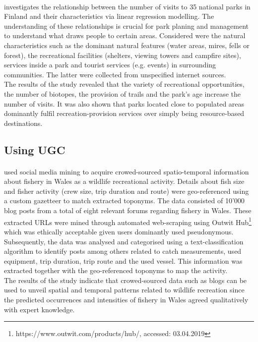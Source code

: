 \paragraph*{\textcite{Neuvonen2010}} investigates the relationship between the number of visits to 35 national parks in Finland and their characteristics via linear regression modelling. The understanding of these relationships is crucial for park planing and management to understand what draws people to certain areas. Considered were the natural characteristics such as the dominant natural features (water areas, mires, fells or forest), the recreational facilities (shelters, viewing towers and campfire sites), services inside a park and tourist services (e.g. events) in surrounding communities. The latter were collected from unspecified internet sources.\\
The results of the study revealed that the variety of recreational opportunities, the number of biotopes, the provision of trails and the park's age increase the number of visits. It was also shown that parks located close to populated areas dominantly fulfil recreation-provision services over simply being resource-based destinations.

\subsection{Using UGC} 

\paragraph*{\textcite{Monkman2018}} used social media mining to acquire crowed-sourced spatio-temporal information about fishery in Wales as a wildlife recreational activity. Details about fish size and fisher activity (crew size, trip duration and route) were geo-referenced using a custom gazetteer to match extracted toponyms. The data consisted of 10'000 blog posts from a total of eight relevant forums regarding fishery in Wales. These extracted URLs were mined through automated web-scraping using Outwit Hub\footnote{https://www.outwit.com/products/hub/, accessed: 03.04.2019} which was ethically acceptable given users dominantly used pseudonymous. Subsequently, the data was analysed and categorised using a text-classification algorithm to identify posts among others related to catch measurements, used equipment, trip duration, trip route and the used vessel. This information was extracted together with the geo-referenced toponyms to map the activity. \\
The results of the study indicate that crowed-sourced data such as blogs can be used to unveil spatial and temporal patterns related to wildlife recreation since the predicted occurrences and intensities of fishery in Wales agreed qualitatively with expert knowledge.

